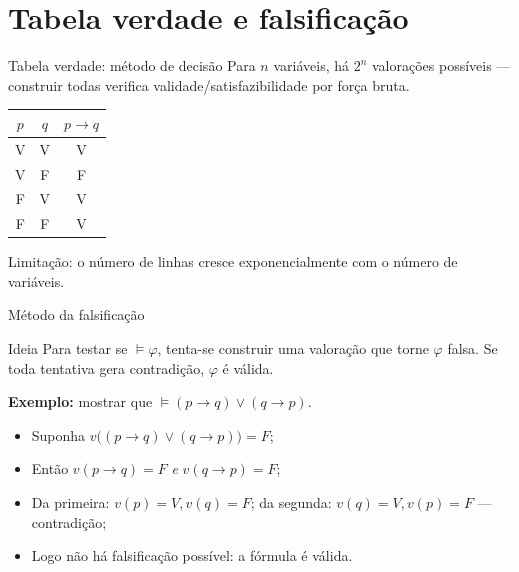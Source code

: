 \documentclass[10pt,aspectratio=169]{beamer}
\newcommand{\dest}[1]{\alert{#1}}
\begin{document}
\section{Tabela verdade e falsificação}
\begin{frame}{Tabela verdade: método de decisão}
  Para $n$ variáveis, há $2^n$ valorações possíveis — construir todas verifica validade/satisfazibilidade por força bruta.
  \begin{center}
    \small
    \begin{tabular}{cc|c}
      \toprule
      $p$ & $q$ & $p\rightarrow q$\\
      \midrule
      V & V & V \\
      V & F & F \\
      F & V & V \\
      F & F & V \\
      \bottomrule
    \end{tabular}\par
  \end{center}
  \dest{Limitação}: o número de linhas cresce exponencialmente com o número de variáveis.
\end{frame}

\begin{frame}{Método da falsificação}
  \begin{block}{Ideia}
    Para testar se $\models\varphi$, tenta-se \dest{construir} uma valoração que torne $\varphi$ falsa. Se toda tentativa gera contradição, $\varphi$ é válida.
  \end{block}
  \textbf{Exemplo:} mostrar que $\models (p\rightarrow q)\lor(q\rightarrow p)$.
  \begin{itemize}
    \item Suponha $v\big((p\to q)\lor(q\to p)\big)=F$;
    \item Então $v(p\to q)=F$ \emph{e} $v(q\to p)=F$;
    \item Da primeira: $v(p)=V,v(q)=F$; da segunda: $v(q)=V,v(p)=F$ — \dest{contradição};
    \item Logo não há falsificação possível: a fórmula é válida.
  \end{itemize}
\end{frame}

\end{document}
